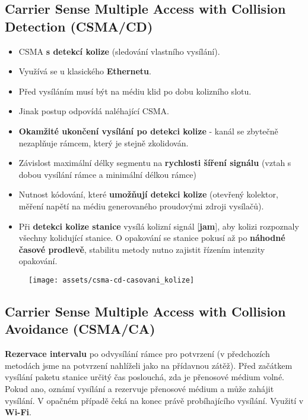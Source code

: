 \subsection{Carrier Sense Multiple Access with Collision Detection (CSMA/CD)}
\begin{itemize}
    \item CSMA \textbf{s detekcí kolize} (sledování vlastního vysílání).
    \item Využívá se u klasického \textbf{Ethernetu}.
    \item Před vysíláním musí být na médiu klid po dobu kolizního slotu.
    \item Jinak postup odpovídá naléhající CSMA.
    \item \textbf{Okamžité ukončení vysílání po detekci kolize} - kanál se zbytečně nezaplňuje rámcem, který je stejně zkolidován.
    \item Závislost maximální délky segmentu na \textbf{rychlosti šíření signálu} (vztah s dobou vysílání rámce a minimální délkou rámce)
    \item Nutnost kódování, které \textbf{umožňují detekci kolize} (otevřený kolektor, měření napětí na médiu generovaného proudovými zdroji vysílačů).
    \item Při \textbf{detekci kolize stanice }vysílá kolizní signál [\textbf{jam}], aby kolizi rozpoznaly všechny kolidující stanice. O opakování se stanice pokusí až po \textbf{náhodné časové prodlevě}, stabilitu metody nutno zajistit řízením intenzity opakování.
\end{itemize}

\begin{figure}[H]
    \centering
    \texttt{[image: assets/csma-cd-casovani\_kolize]}
\end{figure}

\subsection{Carrier Sense Multiple Access with Collision Avoidance (CSMA/CA)}
\textbf{Rezervace intervalu} po odvysílání rámce pro potvrzení (v předchozích metodách jsme na potvrzení nahlíželi jako na  přídavnou zátěž). Před začátkem vysílání paketu stanice určitý čas poslouchá, zda je přenosové médium volné. Pokud ano, oznámí vysílání a rezervuje přenosové médium a může zahájit vysílání. V opačném případě čeká na konec právě probíhajícího vysílání. Využití v \textbf{Wi-Fi}.

